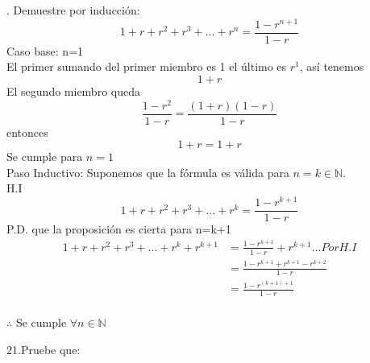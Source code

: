 \documentclass[letterpaper]{article}
\renewcommand{\*}{\cdot}
\theoremstyle{definition}
\begin{document}
. Demuestre por inducción:
$$1+r+r^2+r^3+...+r^n=\frac{1-r^{n+1}}{1-r}$$
Caso base: n=1\\
El primer sumando del primer miembro es 1 el último es $r^1$, así tenemos\\
$$1+r$$ 
El segundo miembro queda $$\frac{1-r^2}{1-r}=\frac{(1+r)(1-r)}{1-r}$$
entonces $$1+r=1+r$$ 
Se cumple para $n=1$\\

Paso Inductivo: Suponemos que la fórmula es válida para $n=k \in \mathbb{N}.$\\
H.I
$$1+r+r^2+r^3+...+r^k=\frac{1-r^{k+1}}{1-r}$$
P.D. que la proposición es cierta para n=k+1
\begin{align*}
	1+r+r^2+r^3+...+r^k+r^{k+1}&=\frac{1-r^{k+1}}{1-r}+r^{k+1}...Por H.I\\
	&=\frac{1-r^{k+1}+r^{k+1}-r^{k+2}}{1-r}\\
	&=\frac{1-r^{(k+1)+1}}{1-r}\\
\end{align*}
\begin{center}
	$\therefore$ Se  cumple  $\forall{n} \in \mathbb{N}$\\
\end{center}

21.Pruebe que:
\end{document}
